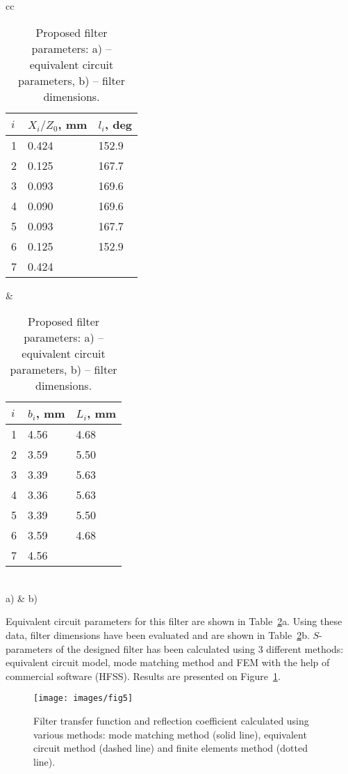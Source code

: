 \documentclass{pj}
\begin{document}
\begin{table}

  \begin{tabular}{cc}
  \begin{tabular}{|l|l|l|}
    \hline
    $i$ & $X_i/Z_0$, mm & $l_i$, deg \\ \hline
    1 & 0.424 & 152.9 \\ \hline
    2 & 0.125 & 167.7 \\ \hline
    3 & 0.093 & 169.6 \\ \hline
    4 & 0.090 & 169.6 \\ \hline
    5 & 0.093 & 167.7 \\ \hline
    6 & 0.125 & 152.9 \\ \hline
    7 & 0.424 & \\ \hline
  \end{tabular} &
  \begin{tabular}{|l|l|l|}
    \hline
    $i$ & $b_i$, mm & $L_i$, mm \\ \hline
    1 & 4.56 & 4.68 \\ \hline
    2 & 3.59 & 5.50 \\ \hline
    3 & 3.39 & 5.63 \\ \hline
    4 & 3.36 & 5.63 \\ \hline
    5 & 3.39 & 5.50 \\ \hline
    6 & 3.59 & 4.68 \\ \hline
    7 & 4.56 & \\ \hline
  \end{tabular} \\
    a) & b) 
  \end{tabular}
  \caption{Proposed filter parameters: a) -- equivalent circuit
    parameters, b) -- filter dimensions.}
  \label{tab:1}
\end{table}

Equivalent circuit parameters for this filter are shown in
Table~\ref{tab:1}a. Using these data, filter
dimensions have been evaluated and are shown in
Table~\ref{tab:1}b. $S$-parameters of the designed
filter has been calculated using 3 different methods: equivalent
circuit model, mode matching method and FEM with the help of commercial
software (HFSS). Results are presented on
Figure~\ref{fig:5}.

\begin{figure}[h]
  \centering
  \texttt{[image: images/fig5]}
  \caption{Filter transfer function and reflection coefficient
    calculated using various methods: mode matching method (solid
    line), equivalent circuit method (dashed line) and finite elements
    method (dotted line).}
  \label{fig:5} 
\end{figure} 
\end{document}
